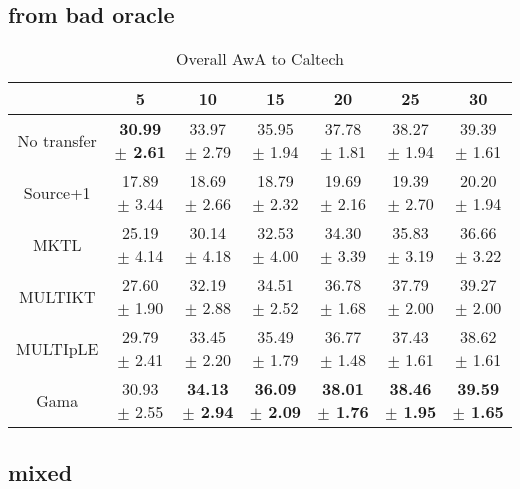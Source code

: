 \subsection{from bad oracle}
\begin{table*}[htbp]
  \centering
  \caption{Overall AwA to Caltech}
    \begin{tabular}{ccccccc}
    \toprule
                & 5              & 10             & 15             & 20             & 25             & 30 \\
    \midrule
    No transfer &         \textbf{30.99 $\pm$ 2.61} &         33.97 $\pm$ 2.79 &         35.95 $\pm$ 1.94 &         37.78 $\pm$ 1.81 &         38.27 $\pm$ 1.94 &         39.39 $\pm$ 1.61 \\
    Source+1    &         17.89 $\pm$ 3.44 &         18.69 $\pm$ 2.66 &         18.79 $\pm$ 2.32 &         19.69 $\pm$ 2.16 &         19.39 $\pm$ 2.70 &         20.20 $\pm$ 1.94 \\
    MKTL        &         25.19 $\pm$ 4.14 &         30.14 $\pm$ 4.18 &         32.53 $\pm$ 4.00 &         34.30 $\pm$ 3.39 &         35.83 $\pm$ 3.19 &         36.66 $\pm$ 3.22 \\
    MULTIKT     &         27.60 $\pm$ 1.90 &         32.19 $\pm$ 2.88 &         34.51 $\pm$ 2.52 &         36.78 $\pm$ 1.68 &         37.79 $\pm$ 2.00 &         39.27 $\pm$ 2.00 \\
    MULTIpLE    &         29.79 $\pm$ 2.41 &         33.45 $\pm$ 2.20 &         35.49 $\pm$ 1.79 &         36.77 $\pm$ 1.48 &         37.43 $\pm$ 1.61 &         38.62 $\pm$ 1.61 \\
    Gama        &         30.93 $\pm$ 2.55 &         \textbf{34.13 $\pm$ 2.94} &         \textbf{36.09 $\pm$ 2.09} &         \textbf{38.01 $\pm$ 1.76} &         \textbf{38.46 $\pm$ 1.95} &         \textbf{39.59 $\pm$ 1.65} \\
    \bottomrule
    \end{tabular}%
  \label{tab:addlabel}%
\end{table*}%

\subsection{mixed}

